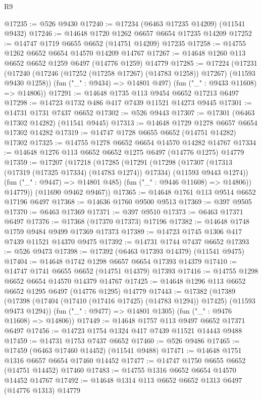 \begin{lexlean}{R9}
\begin{coremodule}
@17235 := @526 @9430
@17240 := @17234 (@6463 @17235 @14209) (@11541 @9432)
@17246 := @14648 @1720 @1262 @6657 @6654 @17235 @14209
@17252 := @14747 @1719 @6655 @6652 (@14751 @14209) @17235
@17258 := @14755 @1262 @6652 @6654 @14570 @14209 @14767
@17267 := @14648 @1260 @113 @6652 @6652 @1259 @6497 (@14776 @1259) @14779
@17285 := @17224
    (@17231
      (@17240 (@17246 (@17252 (@17258 @17267) (@14783 @1258)) @17267) (@11593 @9430 @1258))
      (fun ("_" : @9434) => @14801 @497)
      (fun ("_" : @9433 @11608) => @14806))
@17291 := @14648 @1735 @113 @9454 @6652 @17213 @6497
@17298 := @14723 @1732 @486 @417 @7439 @11521 @14273 @9445
@17301 := @14731 @1731 @7437 @6652
@17302 := @526 @9443
@17307 := @17301 (@6463 @17302 @14282) (@11541 @9445)
@17313 := @14648 @1729 @1278 @6657 @6654 @17302 @14282
@17319 := @14747 @1728 @6655 @6652 (@14751 @14282) @17302
@17325 := @14755 @1278 @6652 @6654 @14570 @14282 @14767
@17334 := @14648 @1276 @113 @6652 @6652 @1275 @6497 (@14776 @1275) @14779
@17359 := @17207
    (@17218
      (@17285
        (@17291
          (@17298
            (@17307 (@17313 (@17319 (@17325 @17334) (@14783 @1274)) @17334) (@11593 @9443 @1274))
            (fun ("_" : @9447) => @14801 @485)
            (fun ("_" : @9446 @11608) => @14806))
          @14779))
      (@11690 @9462 @9467))
@17365 := @14648 @1761 @113 @9514 @6652 @17196 @6497
@17368 := @14636 @1760 @9500 @9513
@17369 := @397 @9505
@17370 := @6463 @17369
@17371 := @397 @9510
@17373 := @6463 @17371 @6497
@17376 := @17368 (@17370 @17373) @17196
@17382 := @14648 @1748 @1759 @9484 @9499 @17369 @17373
@17389 := @14723 @1745 @1306 @417 @7439 @11521 @14370 @9475
@17392 := @14731 @1744 @7437 @6652
@17393 := @526 @9473
@17398 := @17392 (@6463 @17393 @14379) (@11541 @9475)
@17404 := @14648 @1742 @1298 @6657 @6654 @17393 @14379
@17410 := @14747 @1741 @6655 @6652 (@14751 @14379) @17393
@17416 := @14755 @1298 @6652 @6654 @14570 @14379 @14767
@17425 := @14648 @1296 @113 @6652 @6652 @1295 @6497 (@14776 @1295) @14779
@17443 := @17382
    (@17389
      (@17398 (@17404 (@17410 (@17416 @17425) (@14783 @1294)) @17425) (@11593 @9473 @1294))
      (fun ("_" : @9477) => @14801 @1305)
      (fun ("_" : @9476 @11608) => @14806))
@17449 := @14648 @1757 @113 @9497 @6652 @17371 @6497
@17456 := @14723 @1754 @1324 @417 @7439 @11521 @14443 @9488
@17459 := @14731 @1753 @7437 @6652
@17460 := @526 @9486
@17465 := @17459 (@6463 @17460 @14452) (@11541 @9488)
@17471 := @14648 @1751 @1316 @6657 @6654 @17460 @14452
@17477 := @14747 @1750 @6655 @6652 (@14751 @14452) @17460
@17483 := @14755 @1316 @6652 @6654 @14570 @14452 @14767
@17492 := @14648 @1314 @113 @6652 @6652 @1313 @6497 (@14776 @1313) @14779

\end{coremodule}
\end{lexlean}
